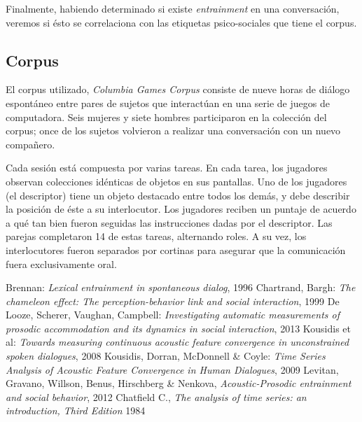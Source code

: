 \documentclass[a4paper,11pt]{article}
\begin{document}
Finalmente, habiendo determinado si existe \emph{entrainment} en una conversación, veremos si ésto se correlaciona con las etiquetas psico-sociales que tiene el corpus.

\subsection*{Corpus}

El corpus utilizado, \emph{Columbia Games Corpus}\cite{LEV2012} consiste de nueve horas de diálogo espontáneo entre pares de sujetos que interactúan en una serie de juegos de computadora. Seis mujeres y siete hombres participaron en la colección del corpus; once de los sujetos volvieron a realizar una conversación con un nuevo compañero.

Cada sesión está compuesta por varias tareas. En cada tarea, los jugadores observan colecciones idénticas de objetos en sus pantallas. Uno de los jugadores (el descriptor) tiene un objeto destacado entre todos los demás, y debe describir la posición de éste a su interlocutor. Los jugadores reciben un puntaje de acuerdo a qué tan bien fueron seguidas las instrucciones dadas por el descriptor. Las parejas completaron 14 de estas tareas, alternando roles. A su vez, los interlocutores fueron separados por cortinas para asegurar que la comunicación fuera exclusivamente oral.


\begin{thebibliography}{9}
    Brennan:
    \emph{Lexical entrainment in spontaneous dialog},
    1996
    Chartrand, Bargh:
    \emph{The chameleon effect: The perception-behavior link and social interaction},
    1999
    De Looze, Scherer, Vaughan, Campbell:
    \emph{Investigating automatic measurements of prosodic accommodation and its dynamics in social interaction},
    2013
    Kousidis et al:
    \emph{Towards measuring continuous acoustic feature convergence in unconstrained spoken dialogues},
    2008
    Kousidis, Dorran, McDonnell \& Coyle:
    \emph{Time Series Analysis of Acoustic Feature Convergence in Human Dialogues},
    2009
    Levitan, Gravano, Willson, Benus, Hirschberg \& Nenkova,
    \emph{Acoustic-Prosodic entrainment and social behavior},
    2012
    Chatfield C.,
    \emph{The analysis of time series: an introduction, Third Edition}
    1984
\end{thebibliography}
\end{document}
